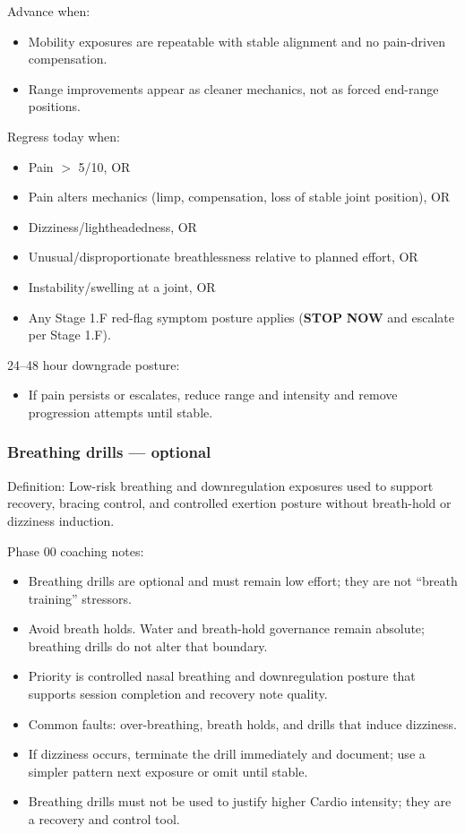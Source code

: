\documentclass[10pt]{article}
\begin{document}
Advance when:

\begin{itemize}
\item Mobility exposures are repeatable with stable alignment and no pain-driven compensation.
\item Range improvements appear as cleaner mechanics, not as forced end-range positions.
\end{itemize}

Regress today when:

\begin{itemize}
\item Pain $>$ 5/10, OR
\item Pain alters mechanics (limp, compensation, loss of stable joint position), OR
\item Dizziness/lightheadedness, OR
\item Unusual/disproportionate breathlessness relative to planned effort, OR
\item Instability/swelling at a joint, OR
\item Any Stage 1.F red-flag symptom posture applies (\textbf{STOP} \textbf{NOW} and escalate per Stage 1.F).
\end{itemize}

24–48 hour downgrade posture:

\begin{itemize}
\item If pain persists or escalates, reduce range and intensity and remove progression attempts until stable.
\end{itemize}

\subsubsection*{Breathing drills — optional}

Definition: Low-risk breathing and downregulation exposures used to support recovery, bracing control, and controlled exertion posture without breath-hold or dizziness induction.

Phase 00 coaching notes:

\begin{itemize}
\item Breathing drills are optional and must remain low effort; they are not “breath training” stressors.
\item Avoid breath holds. Water and breath-hold governance remain absolute; breathing drills do not alter that boundary.
\item Priority is controlled nasal breathing and downregulation posture that supports session completion and recovery note quality.
\item Common faults: over-breathing, breath holds, and drills that induce dizziness.
\item If dizziness occurs, terminate the drill immediately and document; use a simpler pattern next exposure or omit until stable.
\item Breathing drills must not be used to justify higher Cardio intensity; they are a recovery and control tool.
\end{itemize}
\end{document}
